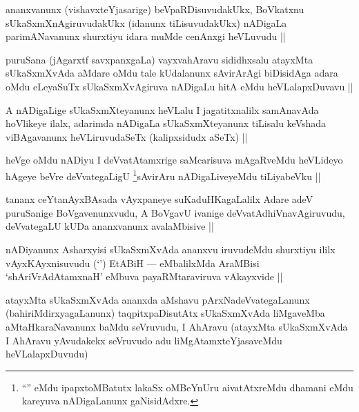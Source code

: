 
\begin{artha}
ananxvanunx (vishavxteYjasarige) beVpaRDisuvudakUkx, BoVkatxnu sUkaSxmXnAgiruvudakUkx (idanunx tiLisuvudakUkx) nADigaLa parimANavanunx shurxtiyu idara muMde cenAnxgi heVLuvudu ||
\end{artha}

\begin{artha}
puruSana (jAgarxtf savxpanxgaLa) vayxvahAravu sididhxsalu atayxMta sUkaSxmXvAda aMdare oMdu tale kUdalanunx sAvirArAgi biDisidAga adara oMdu eLeyaSuTx sUkaSxmXvAgiruva nADigaLu hitA eMdu heVLalapxDuvavu ||
\end{artha}

\begin{artha}
A nADigaLige sUkaSxmXteyanunx heVLalu I jagatitxnalilx samAnavAda hoVlikeye ilalx, adarimda nADigaLa sUkaSxmXteyanunx tiLisalu keVshada viBAgavanunx heVLiruvudaSeTx (kalipxsidudx aSeTx) ||
\end{artha}

\begin{artha}
heVge oMdu nADiyu I deVvatAtamxrige saMcarisuva mAgaRveMdu heVLideyo hAgeye beVre deVvategaLigU \footnote{``\stext'' eMdu ipapxtoMBatutx lakaSx oMBeYnUru aivatAtxreMdu dhamani eMdu kareyuva nADigaLanunx gaNisidAdxre.}sAvirAru nADigaLiveyeMdu tiLiyabeVku ||
\end{artha}


\begin{artha}
tananx ceYtanAyxBAsada vAyxpaneye suKaduHKagaLalilx Adare adeV puruSanige BoVgavenunxvudu, A BoVgavU ivanige deVvatAdhiVnavAgiruvudu, deVvategaLU kUDa ananxvanunx avalaMbisive ||
\end{artha}

\begin{artha}
nADiyanunx Asharxyisi sUkaSxmXvAda ananxvu iruvudeMdu shurxtiyu ililx vAyxKAyxnisuvudu (`\stext') EtABiH --- eMbalilxMda AraMBisi `shAriVrAdAtamxnaH' eMbuva payaRMtaraviruva vAkayxvide ||
\end{artha}

\begin{artha}
atayxMta sUkaSxmXvAda ananxda aMshavu pArxNadeVvategaLanunx (bahiriMdirxyagaLanunx) taqpitxpaDisutAtx sUkaSxmXvAda liMgaveMba aMtaHkaraNavanunx baMdu seVruvudu, I AhAravu (atayxMta sUkaSxmXvAda I AhAravu yAvudakekx seVruvudo adu liMgAtamxteYjasaveMdu heVLalapxDuvudu)
\end{artha}

